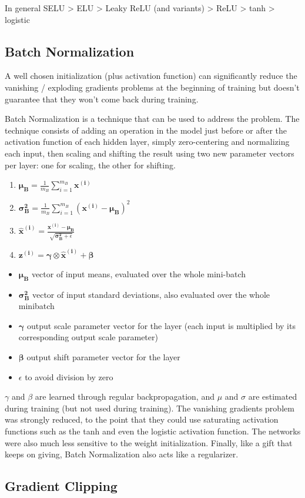\documentclass[french]{article}
\begin{document}
In general SELU > ELU > Leaky ReLU (and variants) > ReLU > tanh > logistic

\subsection{Batch Normalization}

A well chosen initialization (plus activation function) can significantly reduce the vanishing / exploding gradients problems at the beginning of training but doesn't guarantee that they won't come back during training.

Batch Normalization is a technique that can be used to address the problem. The technique consists of adding an operation in the model just before or after the activation function of each hidden layer, simply zero-centering and normalizing each input, then scaling and shifting the result using two new parameter vectors per layer: one for scaling, the other for shifting.

\begin{enumerate}
    \item $\bm{\mu_B} = \frac{1}{m_B} \sum_{i=1}^{m_B} \bm{x^{(i)}}$
    \item $\bm{\sigma_B^2} = \frac{1}{m_B} \sum_{i=1}^{m_B} (\bm{x^{(i)}} - \bm{\mu_B})^2$
    \item $\bm{\hat x^{(i)}} = \frac{\bm{x^{(i)}} - \bm{\mu_B}}{\sqrt{\bm{\sigma_B^2} + \epsilon}}$
    \item $\bm{z^{(i)}} = \bm{\gamma} \otimes \bm{\hat x^{(i)}} + \bm{\beta}$
\end{enumerate}

\begin{itemize}
    \item $\bm{\mu_B}$ vector of input means, evaluated over the whole mini-batch
    \item $\bm{\sigma_B^2}$ vector of input standard deviations, also evaluated over the whole minibatch
    \item $\bm{\gamma}$ output scale parameter vector for the layer (each input is multiplied by its corresponding output scale parameter)
    \item $\bm{\beta}$ output shift parameter vector for the layer
    \item $\epsilon$ to avoid division by zero
\end{itemize}

$\gamma$ and $\beta$ are learned through regular backpropagation, and $\mu$ and $\sigma$ are estimated during training (but not used during training). The vanishing gradients problem was strongly reduced, to the point that they could use saturating activation functions such as the tanh and even the logistic activation function.  The networks were also much less sensitive to the weight initialization. Finally, like a gift that keeps on giving, Batch Normalization also acts like a regularizer.

\subsection{Gradient Clipping}
\end{document}
